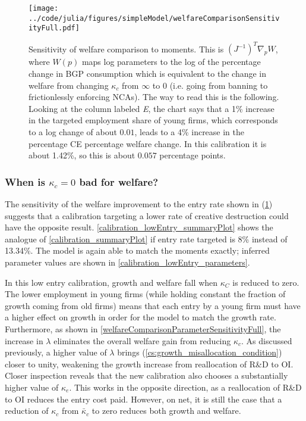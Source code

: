 \documentclass[11pt,english]{article}
\theoremstyle{definition}
\begin{document}
\begin{figure}[]
	\centering
	\texttt{[image: ../code/julia/figures/simpleModel/welfareComparisonSensitivityFull.pdf]}
	\caption{Sensitivity of welfare comparison to moments. This is $(J^{-1})^T \nabla_p W$, where $W(p)$ maps log parameters to the log of the percentage change in BGP consumption which is equivalent to the change in welfare from changing $\kappa_c$ from $\infty$ to $0$ (i.e. going from banning to frictionlessly enforcing NCAs). The way to read this is the following. Looking at the column labeled \textit{E}, the chart says that a 1\% increase in the targeted employment share of young firms, which corresponds to a log change of about $0.01$, leads to a 4\% increase in the percentage CE percentage welfare change. In this calibration it is about 1.42\%, so this is about $0.057$ percentage points.}
	\label{welfareComparisonSensitivityFull}
\end{figure}


\subsubsection{When is $\kappa_c = 0$ bad for welfare?}

The sensitivity of the welfare improvement to the entry rate shown in (\ref{welfareComparisonSensitivityFull}) suggests that a calibration targeting a lower rate of creative destruction could have the opposite result. \autoref{calibration_lowEntry_summaryPlot} shows the analogue of \autoref{calibration_summaryPlot} if entry rate targeted is 8\% instead of 13.34\%. The model is again able to match the moments exactly; inferred parameter values are shown in \autoref{calibration_lowEntry_parameters}.

In this low entry calibration, growth and welfare fall when $\kappa_C$ is reduced to zero. The lower employment in young firms (while holding constant the fraction of growth coming from old firms) means that each entry by a young firm must have a higher effect on growth in order for the model to match the growth rate. Furthermore, as shown in \autoref{welfareComparisonParameterSensitivityFull}, the increase in $\lambda$ eliminates the overall welfare gain from reducing $\kappa_c$. As discussed previously, a higher value of $\lambda$ brings (\ref{cs:growth_misallocation_condition}) closer to unity, weakening the growth increase from reallocation of R\&D to OI. Closer inspection reveals that the new calibration also chooses a substantially higher value of $\kappa_e$. This works in the opposite direction, as a reallocation of R\&D to OI reduces the entry cost paid. However, on net, it is still the case that a reduction of $\kappa_c$ from $\bar{\kappa}_c$ to zero reduces both growth and welfare.
\end{document}
